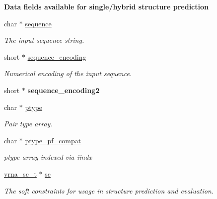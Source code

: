 \begin{Indent}{\bf Data fields available for single/hybrid structure prediction}\par
\begin{DoxyCompactItemize}
\item 
char $\ast$ \hyperlink{group__fold__compound_a87f6abcda89cfb7a486c97e1f5371525}{sequence}
\begin{DoxyCompactList}\small\item\em The input sequence string. \end{DoxyCompactList}\item 
short $\ast$ \hyperlink{group__fold__compound_a9934bdb695d35a3544285cbcc19f9763}{sequence\-\_\-encoding}
\begin{DoxyCompactList}\small\item\em Numerical encoding of the input sequence. \end{DoxyCompactList}\item 
\hypertarget{group__fold__compound_aaf9064092f674882e78665e1646ffdbf}{short $\ast$ {\bfseries sequence\-\_\-encoding2}}\label{group__fold__compound_aaf9064092f674882e78665e1646ffdbf}

\item 
char $\ast$ \hyperlink{group__fold__compound_a3fbea559f1d1976b2d67c215cdeee0b2}{ptype}
\begin{DoxyCompactList}\small\item\em Pair type array. \end{DoxyCompactList}\item 
char $\ast$ \hyperlink{group__fold__compound_a7fe1235ce3d41287695f1ae1e283e8fc}{ptype\-\_\-pf\-\_\-compat}
\begin{DoxyCompactList}\small\item\em ptype array indexed via iindx \end{DoxyCompactList}\item 
\hyperlink{group__constraints_ga75401ce219ef8dbcceb672db82d434c6}{vrna\-\_\-sc\-\_\-t} $\ast$ \hyperlink{group__fold__compound_ac7089e90460ad3990a308808c8044c9f}{sc}
\begin{DoxyCompactList}\small\item\em The soft constraints for usage in structure prediction and evaluation. \end{DoxyCompactList}\end{DoxyCompactItemize}
\end{Indent}
